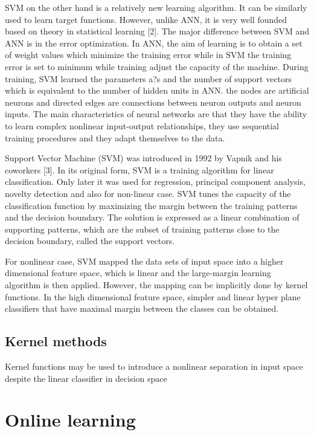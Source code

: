 SVM on the other hand is a relatively new learning algorithm. It can be
similarly used to learn target functions. However, unlike ANN, it is very well founded
based on theory in statistical learning [2]. The major difference between SVM and ANN
is in the error optimization. In ANN, the aim of learning is to obtain a set of weight
values which minimize the training error while in SVM the training error is set to
minimum while training adjust the capacity of the machine. During training, SVM
learned the parameters a?s and the number of support vectors which is equivalent to the
number of hidden units in ANN.
the nodes are artificial
neurons and directed edges are connections between neuron outputs and neuron inputs.
The main characteristics of neural networks are that they have the ability to learn
complex nonlinear input-output relationships, they use sequential training procedures and
they adapt themselves to the data.




Support Vector Machine (SVM) was introduced in 1992 by Vapnik and his coworkers
[3]. In its original form, SVM is a training algorithm for linear classification.
Only later it was used for regression, principal component analysis, novelty detection and
also for non-linear case. SVM tunes the capacity of the classification function by
maximizing the margin between the training patterns and the decision boundary. The
solution is expressed as a linear combination of supporting patterns, which are the subset
of training patterns close to the decision boundary, called the support vectors. 

For nonlinear
case, SVM mapped the data sets of input space into a higher dimensional feature
space, which is linear and the large-margin learning algorithm is then applied. However,
the mapping can be implicitly done by kernel functions. In the high dimensional feature
space, simpler and linear hyper plane classifiers that have maximal margin between the
classes can be obtained.


\subsection{Kernel methods}

Kernel functions may be used to introduce a nonlinear separation
in input space despite the linear classifier in decision space

\section{Online learning} \label{sec:onoffline}

